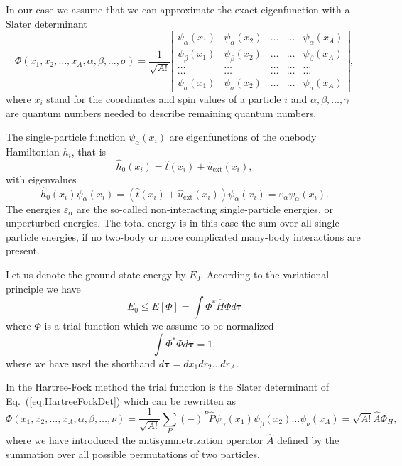 \documentclass[graybox,sectrefs,envcountresetchap,open=right]{svmonodo}
\begin{document}
In our case we assume that  we can approximate the exact eigenfunction with a Slater determinant
\begin{equation}
   \Phi(x_1, x_2,\dots ,x_A,\alpha,\beta,\dots, \sigma)=\frac{1}{\sqrt{A!}}
\left| \begin{array}{ccccc} \psi_{\alpha}(x_1)& \psi_{\alpha}(x_2)& \dots & \dots & \psi_{\alpha}(x_A)\\
                            \psi_{\beta}(x_1)&\psi_{\beta}(x_2)& \dots & \dots & \psi_{\beta}(x_A)\\  
                            \dots & \dots & \dots & \dots & \dots \\
                            \dots & \dots & \dots & \dots & \dots \\
                     \psi_{\sigma}(x_1)&\psi_{\sigma}(x_2)& \dots & \dots & \psi_{\sigma}(x_A)\end{array} \right|, \label{eq:HartreeFockDet}
\end{equation}
where  $x_i$  stand for the coordinates and spin values of a particle $i$ and $\alpha,\beta,\dots, \gamma$ 
are quantum numbers needed to describe remaining quantum numbers.  



The single-particle function $\psi_{\alpha}(x_i)$  are eigenfunctions of the onebody
Hamiltonian $h_i$, that is
\[
\hat{h}_0(x_i)=\hat{t}(x_i) + \hat{u}_{\mathrm{ext}}(x_i),
\]
with eigenvalues 
\[
\hat{h}_0(x_i) \psi_{\alpha}(x_i)=\left(\hat{t}(x_i) + \hat{u}_{\mathrm{ext}}(x_i)\right)\psi_{\alpha}(x_i)=\varepsilon_{\alpha}\psi_{\alpha}(x_i).
\]
The energies $\varepsilon_{\alpha}$ are the so-called non-interacting single-particle energies, or unperturbed energies. 
The total energy is in this case the sum over all  single-particle energies, if no two-body or more complicated
many-body interactions are present.



Let us denote the ground state energy by $E_0$. According to the
variational principle we have
\[
  E_0 \le E[\Phi] = \int \Phi^*\hat{H}\Phi d\mathbf{\tau}
\]
where $\Phi$ is a trial function which we assume to be normalized
\[
  \int \Phi^*\Phi d\mathbf{\tau} = 1,
\]
where we have used the shorthand $d\mathbf{\tau}=dx_1dr_2\dots dr_A$.



In the Hartree-Fock method the trial function is the Slater
determinant of Eq.~(\ref{eq:HartreeFockDet}) which can be rewritten as 
\[
  \Phi(x_1,x_2,\dots,x_A,\alpha,\beta,\dots,\nu) = \frac{1}{\sqrt{A!}}\sum_{P} (-)^P\hat{P}\psi_{\alpha}(x_1)
    \psi_{\beta}(x_2)\dots\psi_{\nu}(x_A)=\sqrt{A!}\hat{A}\Phi_H,
\]
where we have introduced the antisymmetrization operator $\hat{A}$ defined by the 
summation over all possible permutations of two particles.
\end{document}

